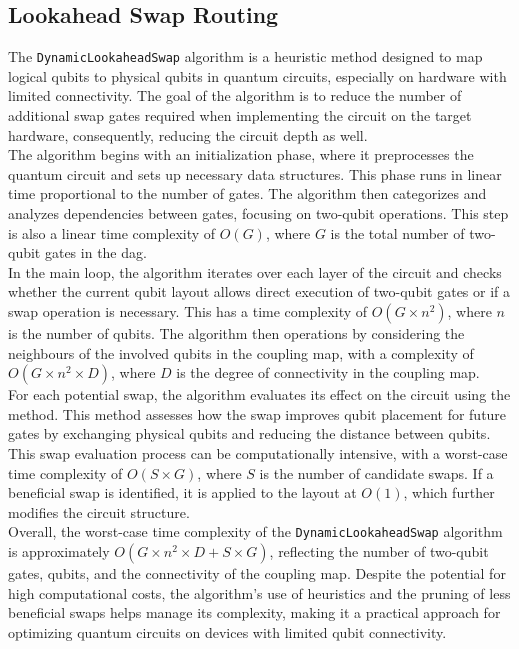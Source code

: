 \subsection{Lookahead Swap Routing} %
The \lstinline{DynamicLookaheadSwap} algorithm is a heuristic method designed to map logical qubits to physical qubits in quantum circuits, especially on hardware with limited connectivity. The goal of the algorithm is to reduce the number of additional swap gates required when implementing the circuit on the target hardware, consequently, reducing the circuit depth as well. \\
The algorithm begins with an initialization phase, where it preprocesses the quantum circuit and sets up necessary data structures. This phase runs in linear time proportional to the number of gates. The algorithm then categorizes and analyzes dependencies between gates, focusing on two-qubit operations. This step is also a linear time complexity of $O(G)$, where $G$ is the total number of two-qubit gates in the \acrshort{dag}. \\
In the main loop, the algorithm iterates over each layer of the circuit and checks whether the current qubit layout allows direct execution of two-qubit gates or if a swap operation is necessary. This  has a time complexity of $O(G \times n^2)$, where $n$ is the number of qubits. The algorithm then  operations by considering the neighbours of the involved qubits in the coupling map, with a complexity of $O(G \times n^2 \times D)$, where $D$ is the degree of connectivity in the coupling map. \\
For each potential swap, the algorithm evaluates its effect on the circuit using the  method. This method assesses how the swap improves qubit placement for future gates by exchanging physical qubits and reducing the distance between qubits. This swap evaluation process can be computationally intensive, with a worst-case time complexity of $O(S \times G)$, where $S$ is the number of candidate swaps. If a beneficial swap is identified, it is applied to the layout at $O(1)$, which further modifies the circuit structure. \\
Overall, the worst-case time complexity of the \lstinline{DynamicLookaheadSwap} algorithm is approximately $O(G \times n^2 \times D + S \times G)$, reflecting the number of two-qubit gates, qubits, and the connectivity of the coupling map. Despite the potential for high computational costs, the algorithm's use of heuristics and the pruning of less beneficial swaps helps manage its complexity, making it a practical approach for optimizing quantum circuits on devices with limited qubit connectivity.

